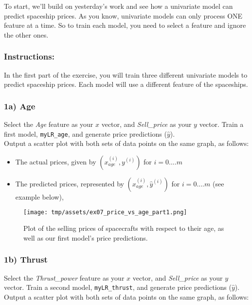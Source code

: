 \documentclass[]{article}
\begin{document}
To start, we'll build on yesterday's work and see how a univariate model
can predict spaceship prices. As you know, univariate models can only
process ONE feature at a time. So to train each model, you need to
select a feature and ignore the other ones.

\hypertarget{instructions-8}{%
\subsubsection{Instructions:}\label{instructions-8}}

In the first part of the exercise, you will train three different
univariate models to predict spaceship prices. Each model will use a
different feature of the spaceships.

\hypertarget{a-age}{%
\subsubsection{1a) Age}\label{a-age}}

Select the \emph{Age} feature as your \(x\) vector, and
\emph{Sell\_price} as your \(y\) vector. Train a first model,
\texttt{myLR\_age}, and generate price predictions (\(\hat{y}\)).\\
Output a scatter plot with both sets of data points on the same graph,
as follows:

\begin{itemize}
\item
  The actual prices, given by \((x_{age}^{(i)},y^{(i)})\) for
  \(i=0....m\)
\item
  The predicted prices, represented by \((x_{age}^{(i)},\hat{y}^{(i)})\)
  for \(i=0....m\) (see example below),
\end{itemize}

\begin{figure}
\centering
\texttt{[image: tmp/assets/ex07\_price\_vs\_age\_part1.png]}
\caption{Plot of the selling prices of spacecrafts with respect to their
age, as well as our first model's price predictions.}
\end{figure}

\hypertarget{b-thrust}{%
\subsubsection{1b) Thrust}\label{b-thrust}}

Select the \emph{Thrust\_power} feature as your \(x\) vector, and
\emph{Sell\_price} as your \(y\) vector. Train a second model,
\texttt{myLR\_thrust}, and generate price predictions (\(\hat{y}\)).\\
Output a scatter plot with both sets of data points on the same graph,
as follows:
\end{document}
